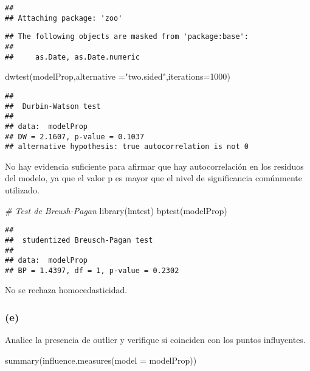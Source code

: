 \documentclass[
]{article}
\newenvironment{Shaded}{\begin{snugshade}}{\end{snugshade}}
\newcommand{\AttributeTok}[1]{\textcolor[rgb]{0.77,0.63,0.00}{#1}}
\newcommand{\CommentTok}[1]{\textcolor[rgb]{0.56,0.35,0.01}{\textit{#1}}}
\newcommand{\DecValTok}[1]{\textcolor[rgb]{0.00,0.00,0.81}{#1}}
\newcommand{\FunctionTok}[1]{\textcolor[rgb]{0.00,0.00,0.00}{#1}}
\newcommand{\NormalTok}[1]{#1}
\newcommand{\StringTok}[1]{\textcolor[rgb]{0.31,0.60,0.02}{#1}}
\begin{document}
\begin{verbatim}
## 
## Attaching package: 'zoo'
\end{verbatim}

\begin{verbatim}
## The following objects are masked from 'package:base':
## 
##     as.Date, as.Date.numeric
\end{verbatim}

\begin{Shaded}
\begin{Highlighting}[]
\FunctionTok{dwtest}\NormalTok{(modelProp,}\AttributeTok{alternative =}\StringTok{"two.sided"}\NormalTok{,}\AttributeTok{iterations=}\DecValTok{1000}\NormalTok{)}
\end{Highlighting}
\end{Shaded}

\begin{verbatim}
## 
##  Durbin-Watson test
## 
## data:  modelProp
## DW = 2.1607, p-value = 0.1037
## alternative hypothesis: true autocorrelation is not 0
\end{verbatim}

No hay evidencia suficiente para afirmar que hay autocorrelación en los
residuos del modelo, ya que el valor p es mayor que el nivel de
significancia comúnmente utilizado.

\begin{Shaded}
\begin{Highlighting}[]
\CommentTok{\# Test de Breush{-}Pagan}
\FunctionTok{library}\NormalTok{(lmtest)}
\FunctionTok{bptest}\NormalTok{(modelProp)}
\end{Highlighting}
\end{Shaded}

\begin{verbatim}
## 
##  studentized Breusch-Pagan test
## 
## data:  modelProp
## BP = 1.4397, df = 1, p-value = 0.2302
\end{verbatim}

No se rechaza homocedasticidad.

\hypertarget{e-2}{%
\subsubsection{(e)}\label{e-2}}

Analice la presencia de outlier y verifique si coinciden con los puntos
influyentes.

\begin{Shaded}
\begin{Highlighting}[]
\FunctionTok{summary}\NormalTok{(}\FunctionTok{influence.measures}\NormalTok{(}\AttributeTok{model =}\NormalTok{ modelProp))}
\end{Highlighting}
\end{Shaded}
\end{document}
